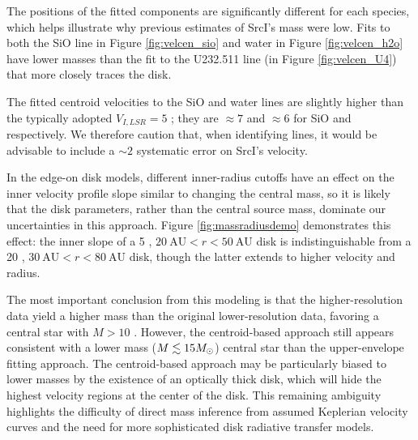 \documentclass[twocolumn]{aastex61}
\newcommand{\sourcei}{SrcI\xspace}
\begin{document}
The positions of the fitted components are significantly different for each
species, which helps illustrate why previous estimates of \sourcei's mass were
low.  Fits to both the SiO line in Figure \ref{fig:velcen_sio} and water in
Figure \ref{fig:velcen_h2o} have lower masses than the fit to the U232.511 line
(in Figure \ref{fig:velcen_U4}) that more closely traces the disk.

The fitted centroid velocities to the SiO and water lines are slightly higher
than the typically adopted $V_{I,LSR}=5$ \kms; they are  $\approx7$ and
$\approx6$ \kms for SiO and \water respectively.  We therefore caution that,
when identifying lines, it would be advisable to include a $\sim2$ \kms
systematic error on \sourcei's velocity.




In the edge-on disk models, different inner-radius cutoffs have an effect on
the inner velocity profile slope similar to changing the central mass, so it is
likely that the disk parameters, rather than the central source mass, dominate
our uncertainties in this approach.  
Figure \ref{fig:massradiusdemo} demonstrates this effect: the inner slope of
a 5 \msun, $20~\mathrm{AU} < r < 50~\mathrm{AU}$ disk is indistinguishable
from a 20 \msun , $30~\mathrm{AU} < r < 80~\mathrm{AU}$ disk, though the latter
extends to higher velocity and radius.

The most important conclusion from this modeling is that the higher-resolution
data yield a higher mass than the original lower-resolution data, favoring
a central star with $M>10$ \msun.  However, the centroid-based approach
still appears consistent with a lower mass ($M\lesssim15M_{\odot}$) central star
than the \citet{Seifried2016a} upper-envelope fitting approach.
The centroid-based approach may be particularly biased to lower masses
by the existence of an optically thick disk, which will hide the highest
velocity regions at the center of the disk.
This remaining
ambiguity highlights the difficulty of direct mass inference from assumed
Keplerian velocity curves and the need for more sophisticated disk radiative
transfer models.
\end{document}
